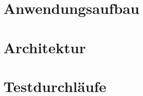 \section{\label{chap:aufbau}Anwendungsaufbau}

%
%

%
%
%
\section{Architektur}

%
%

%
%

%
%

%
%
\section{\label{chap:konzept:test}Testdurchläufe}

